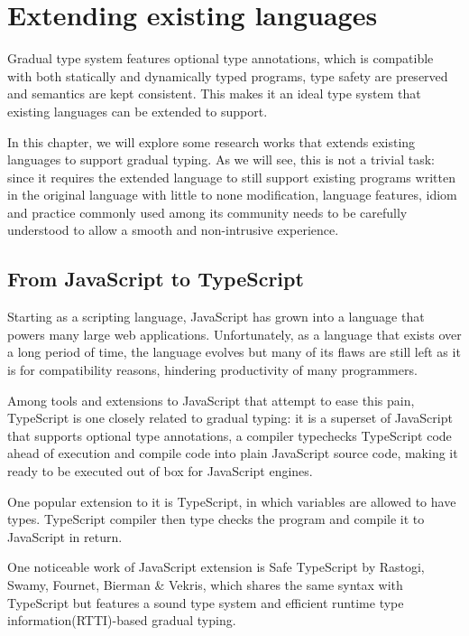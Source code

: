 
\renewcommand{\thechapter}{2}

\chapter{Extending existing languages}

Gradual type system features optional type annotations,
which is compatible with both statically and dynamically typed programs,
type safety are preserved and semantics are kept consistent.
This makes it an ideal type system that
existing languages can be extended to support.

In this chapter, we will explore some research works that extends existing languages
to support gradual typing. As we will see, this is not a trivial task:
since it requires the extended language to still support existing programs written
in the original language with little to none modification,
language features, idiom and practice commonly used among its community
needs to be carefully understood to allow a smooth and non-intrusive experience.

\section{From JavaScript to TypeScript}

Starting as a scripting language, JavaScript has grown into a language
that powers many large web applications.
Unfortunately, as a language that exists over a long period of time,
the language evolves but many of its flaws are still left as it is for compatibility reasons,
hindering productivity of many programmers.

Among tools and extensions to JavaScript that attempt to ease this pain,
TypeScript is one closely related to gradual typing:
it is a superset of JavaScript that supports optional type annotations,
a compiler typechecks TypeScript code ahead of execution and compile code
into plain JavaScript source code, making it ready to be executed out of box
for JavaScript engines.


One popular extension to it is TypeScript, in which variables are allowed to
have types. TypeScript compiler then type checks the program and compile it to JavaScript
in return.

One noticeable work of JavaScript extension is Safe TypeScript by Rastogi, Swamy, Fournet, Bierman \& Vekris, which shares the same syntax with TypeScript
but features a sound type system and efficient runtime type information(RTTI)-based
gradual typing.

